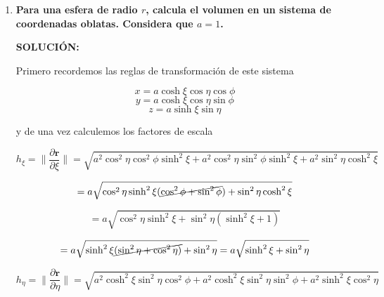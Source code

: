 \documentclass[12pt,a4paper]{article}
\providecommand{\norm}[1]{\lVert#1\rVert}
\begin{document}
\begin{enumerate}
    \item \textbf{Para una esfera de radio $r$, calcula el volumen en un sistema de coordenadas oblatas. Considera que $a = 1$.}
    
    \textbf{SOLUCIÓN:}
    
    Primero recordemos las reglas de transformación de este sistema
    
        \begin{equation*}
        x = a \cosh{\xi} \cos{\eta} \cos{\phi} 
    \end{equation*}
    \begin{equation*}
        y = a \cosh{\xi} \cos{\eta} \sin{\phi}
    \end{equation*}
    \begin{equation*}
        z = a \sinh{\xi} \sin{\eta} 
    \end{equation*}
    
    y de una vez calculemos los factores de escala
    
    \begin{equation*}
            h_\xi = \norm{\frac{\partial \textbf{r}}{\partial \xi}} = \sqrt{a^2 \cos^2{\eta} \cos^2{\phi}\sinh^2{\xi}+ a^2 \cos^2{\eta}\sin^2{\phi} \sinh^2{\xi} + a^2 \sin^2{\eta} \cosh^2{\xi}}
        \end{equation*}
        
        \begin{equation*}
            = a\sqrt{\cos^2{\eta} \sinh^2{\xi}(\cancel{\cos^2{\phi} + \sin^2{\phi}}) + \sin^2{\eta} \cosh^2{\xi}}
        \end{equation*}
        
        \begin{equation*}
            = a \sqrt{\cos^2{\eta}\sinh^2{\xi} + \sin^2{\eta} (\sinh^2{\xi} + 1)}
        \end{equation*}
        
        \begin{equation*}
            = a \sqrt{\sinh^2{\xi}\cancel{(\sin^2{\eta}+ \cos^2{\eta})}+ \sin^2{\eta}}= a\sqrt{\sinh^2{\xi} + \sin^2{\eta}}
        \end{equation*}
        
        \begin{equation*}
            h_\eta = \norm{\frac{\partial \textbf{r}}{\partial \eta}} =\sqrt{a^2 \cosh^2{\xi}\sin^2{\eta}\cos^2{\phi} + a^2 \cosh^2{\xi}\sin^2{\eta}\sin^2{\phi} + a^2 \sinh^2{\xi}\cos^2{\eta}}
        \end{equation*}
        

\end{enumerate}
\end{document}
